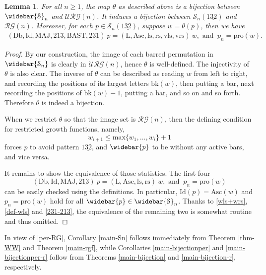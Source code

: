 \documentclass[12pt]{amsart}
\numberwithin{equation}{section}
\theoremstyle{plain}
\newtheorem{lemma}[theorem]{Lemma}
\theoremstyle{definition}
\def\MAJ{\mathrm{MAJ}}
\def\BAST{\mathrm{BAST}}
\def\bk{\mathrm{bk}}
\def\ls{\mathrm{ls}}
\def\rs{\mathrm{rs}}
\def\wrs{\mathrm{vrs}}
\def\wls{\mathrm{vls}}
\def\pl{\mathrm{pro}}
\def\Asc{\mathrm{Asc}}
\def\LL{\mathrm{L}}
\def\Db{\mathrm{Db}}
\def\Id{\mathrm{Id}}
\def\max{\mathrm{max}}
\def\SS{\mathcal{S}}
\def\RG{\mathcal{RG}}
\def\URG{\mathcal{URG}}
\begin{document}
\begin{lemma}\label{lem-rgf2per}
For all $n\ge 1$, the map $\theta$ as described above is a bijection between $\widebar{\SS}_n$ and $\URG(n)$. It induces a bijection between $\SS_n(1\underline{32})$ and $\RG(n)$. Moreover, for each $p\in\SS_n(1\underline{32})$, suppose $w=\theta(p)$, then we have
 \begin{align}\label{per-RG}
 (\Db,\Id,\MAJ,2\underline{13},\BAST,2\underline{31})~p = (\LL,\Asc,\ls,\rs,\wls,\wrs)~ w, \text{ and }~p_n=\pl(w).
 \end{align}
\end{lemma}
\begin{proof}
By our construction, the image of each barred permutation in $\widebar{\SS_n}$ is clearly in $\URG(n)$, hence $\theta$ is well-defined. The injectivity of $\theta$ is also clear. The inverse of $\theta$ can be described as reading $w$ from left to right, and recording the positions of its largest letters $\bk(w)$, then putting a bar, next recording the positions of $\bk(w)-1$, putting a bar, and so on and so forth. Therefore $\theta$ is indeed a bijection.

When we restrict $\theta$ so that the image set is $\RG(n)$, then the defining condition for restricted growth functions, namely, $$w_{i+1}\le \max\{w_1,\ldots,w_i\}+1$$ forces $p$ to avoid pattern $1\underline{32}$, and $\widebar{p}$ to be without any active bars, and vice versa.

It remains to show the equivalence of those statistics. The first four $$(\Db,\Id,\MAJ,2\underline{13})~p=(\LL,\Asc,\ls,\rs)~w, \text{ and }~p_n=\pl(w)$$ can be easily checked using the definitions. In particular, $\Id(p)=\Asc(w)$ and $p_n=\pl(w)$ hold for all $\widebar{p}\in\widebar{\SS}_n$. Thanks to \eqref{wls+wrs}, \eqref{def-wls} and \eqref{231-213}, the equivalence of the remaining two is somewhat routine and thus omitted.
\end{proof}
In view of \eqref{per-RG},
Corollary \ref{main-Sn} follows  immediately from
Theorem \ref{thm-WW} and  Theorem \ref{main-rgf},
while Corollaries \ref{main-bijectionper} and \ref{main-bijectionper-r} follow from
Theorems \ref{main-bijection} and \ref{main-bijection-r}, respectively.
\end{document}
